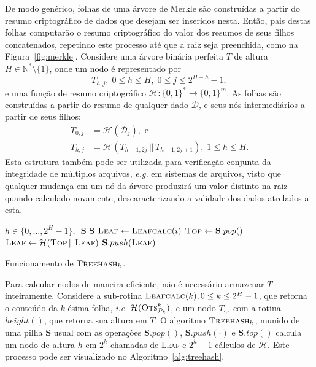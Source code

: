 \documentclass{ufsctex/ufsctex}
\newcommand{\hh}{\mathcal{H}}
\newcommand{\pk}{\mathcal{P}_{k}}
\newcommand{\hash}[2][]{\mathcal{H}^{#1} (#2)}
\newcommand{\concat}{\, \vert{} \vert{} \,}
\newcommand{\binwds}[1]{\{0, 1\}^{#1}}
\newcommand{\fhash}[1]{\hh{}: \binwds{*} \longrightarrow{} \binwds{#1}}
\begin{document}
De modo genérico, folhas de uma árvore de Merkle são construídas a partir do
resumo criptográfico de dados que desejam ser inseridos nesta. Então, pais
destas folhas computarão o resumo criptográfico do valor dos resumos de seus
filhos concatenados, repetindo este processo até que a raiz seja preenchida,
como na Figura~\ref{fig:merkle}. Considere uma árvore binária perfeita $T$ de
altura $H \in \mathbb{N}^{*}\setminus\{1\}$, onde um nodo é representado por
\begin{equation}
  T_{h, j}, \; 0 \leq h \leq H, \; 0 \leq j \leq 2^{H - h} - 1,
\end{equation}
e uma função de resumo criptográfico $\fhash{m}$. As folhas são construídas a
partir do resumo de qualquer dado $\mathcal{D}$, e seus nós intermediários a
partir de seus filhos:
\begin{equation}
  \begin{split}
    T_{0, j} &= \hash{\mathcal{D}_{j}}, \text{ e } \\
    T_{h, j} &= \hash{T_{h - 1, 2j} \concat T_{h - 1, 2j + 1}},
      \; 1 \leq h \leq H.
  \end{split}
\end{equation}
Esta estrutura também pode ser utilizada para verificação conjunta da
integridade de múltiplos arquivos, \emph{e.g.} em sistemas de arquivos, visto
que qualquer mudança em um nó da árvore produzirá um valor distinto na raiz
quando calculado novamente, descaracterizando a validade dos dados atrelados a
esta.

\begin{algorithm}
  \begin{algorithmic}
    \REQUIRE{}  $h \in \{0, \dots, 2^{H} - 1\}, \enspace \mathbf{S}$
    \ENSURE{}  $\mathbf{S}$ 
    \STATE{}  $\textsc{Leaf} \leftarrow \textsc{Leafcalc}(i)$
      \STATE{}  $\textsc{Top} \leftarrow \mathbf{S}.pop()$
      \STATE{}  $\textsc{Leaf} \leftarrow
        \hash{\textsc{Top} \concat \textsc{Leaf}}$
    \ENDWHILE{}
    \STATE{}  $\mathbf{S}.push(\textsc{Leaf})$
  \end{algorithmic}
  \caption{Funcionamento de $\textsc{Treehash}_{h}$.}\label{alg:treehash}
\end{algorithm}

Para calcular nodos de maneira eficiente, não é necessário armazenar $T$
inteiramente. Considere a sub-rotina $\textsc{Leafcalc}(k), 0 \leq k \leq 2^{H}
- 1$, que retorna o conteúdo da $k$-ésima folha, \emph{i.e.}
$\hash{\textsc{Ots}^{k}_{\pk{}}}$, e um nodo $T_{\cdot, \cdot}$ com a rotina
$height()$, que retorna sua altura em $T$. O algoritmo $\textsc{Treehash}_{h}$,
munido de uma pilha \textbf{S} usual com as operações $\mathbf{S}.pop()$,
$\mathbf{S}.push(\cdot)$ e $\mathbf{S}.top()$ calcula um nodo de altura $h$ em
$2^{h}$ chamadas de \textsc{Leaf} e $2^{h} - 1$ cálculos de $\hh{}$. Este
processo pode ser visualizado no Algoritmo~\ref{alg:treehash}.
\end{document}
